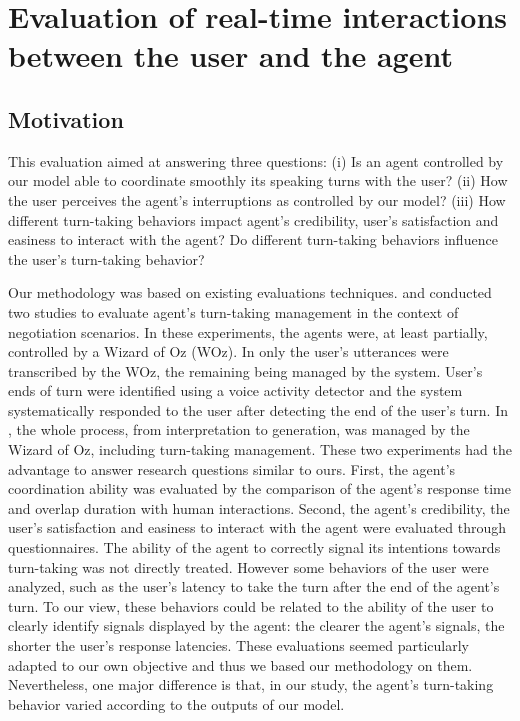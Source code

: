 \section{Evaluation of real-time interactions between the user and the agent}
\label{sec:eval}


\subsection{Motivation}
\label{subsec:mot}

This evaluation aimed at answering three questions: 
(i) Is an agent controlled by our model able to coordinate smoothly its speaking turns with the user?
(ii) How the user perceives the agent's interruptions as controlled by our model?
(iii) How different turn-taking behaviors impact agent's credibility, user's satisfaction and easiness to interact with the agent? Do different turn-taking behaviors influence the user's turn-taking behavior? 

Our methodology was based on existing evaluations techniques.
\cite{skantze_towards_2010} and \cite{de_vault_toward_2015} conducted two studies to evaluate agent's turn-taking management in the context of negotiation scenarios. In these experiments, the agents were, at least partially, controlled by a Wizard of Oz (WOz). In \cite{skantze_towards_2010} only the user's utterances were transcribed by the WOz, the remaining being managed by the system. User's ends of turn were identified using a voice activity detector and the system systematically responded to the user after detecting the end of the user's turn. In \cite{de_vault_toward_2015}, the whole process, from interpretation to generation, was managed by the Wizard of Oz, including turn-taking management. These two experiments had the advantage to answer research questions similar to ours. First, the agent's coordination ability was evaluated by the comparison of the agent's response time and overlap duration with human interactions. Second, the agent's credibility, the user's satisfaction and easiness to interact with the agent were evaluated through questionnaires. The ability of the agent to correctly signal its intentions towards turn-taking was not directly treated. However some behaviors of the user were analyzed, such as the user's latency to take the turn after the end of the agent's turn. To our view, these behaviors could be related to the ability of the user to clearly identify signals displayed by the agent: the clearer the agent's signals, the shorter the user's response latencies. These evaluations seemed particularly adapted to our own objective and thus we based our methodology on them. Nevertheless, one major difference is that, in our study, the agent's turn-taking behavior varied according to the outputs of our model. 

